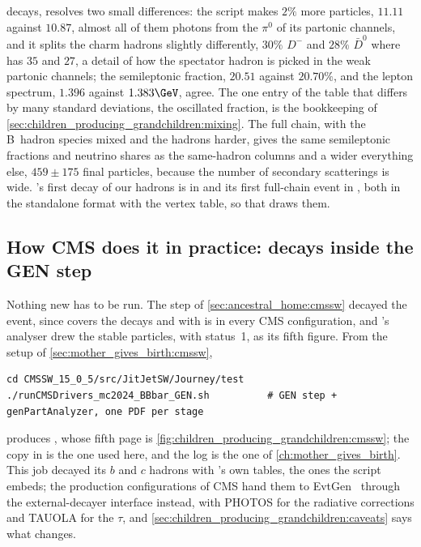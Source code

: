 decays, resolves two small differences: the script makes $2\%$ more
particles, $11.11$ against $10.87$, almost all of them photons from the
$\pi^0$ of its partonic channels, and it splits the charm hadrons
slightly differently, $30\%$ $D^-$ and $28\%$ $\bar D^0$ where \PYTHIA
has $35$ and $27$, a detail of how the spectator hadron is picked in the
weak partonic channels; the semileptonic fraction, $20.51$ against
$20.70\%$, and the lepton spectrum, $1.396$ against $1.383\GeV$, agree.
The one entry of the table that differs by many standard deviations,
the oscillated fraction, is the bookkeeping of
\cref{sec:children_producing_grandchildren:mixing}. The full chain, with
the B~hadron species mixed and the hadrons harder, gives the same
semileptonic fractions and neutrino shares as the same-hadron columns
and a wider everything else, $459\pm175$ final particles, because the
number of secondary scatterings is wide. \PYTHIA's first decay of our
hadrons is in  and
its first full-chain event in ,
both in the standalone format with the vertex table, so that
 draws them.

\subsection{How CMS does it in practice: decays inside the GEN step}
\label{sec:children_producing_grandchildren:cmssw}

Nothing new has to be run. The  step of
\cref{sec:ancestral_home:cmssw} decayed the event, since
 covers the decays and
 with  is in every
CMS configuration, and 's analyser drew the stable
particles,  with status~1, as its fifth figure. From
the setup of \cref{sec:mother_gives_birth:cmssw},
\begin{verbatim}
cd CMSSW_15_0_5/src/JitJetSW/Journey/test
./runCMSDrivers_mc2024_BBbar_GEN.sh          # GEN step + genPartAnalyzer, one PDF per stage
\end{verbatim}
produces , whose fifth
page is \cref{fig:children_producing_grandchildren:cmssw}; the copy in
 is the one used here, and the log is the one
of \cref{ch:mother_gives_birth}. This job decayed its $b$ and $c$ hadrons
with \PYTHIA's own tables, the ones the script embeds; the production
configurations of CMS hand them to EvtGen~\cite{Lange:2001uf} through the
external-decayer interface instead, with PHOTOS for the radiative
corrections and TAUOLA for the $\tau$, and
\cref{sec:children_producing_grandchildren:caveats} says what changes.

